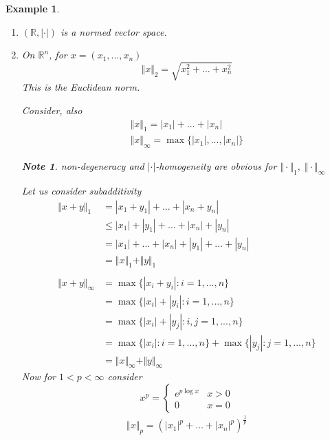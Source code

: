 \documentclass[11pt, oneside]{book}
\theoremstyle{break}
\newtheorem*{note}{Note}
\newtheorem{eg}{Example}[section]
\newcommand{\bb}[1]{\mathbb{#1}}			%
\begin{document}
\begin{eg}
	\begin{enumerate}
		\item $(\bb{R}, |\cdot|)$ is a normed vector space.
		\item On $\bb{R}^n$, for $x = (x_1, ..., x_n)$
			\begin{equation}
				\Vert x\Vert _2 = \sqrt{x_1^2 + \hdots + x_n^2}
			\end{equation}
			This is the Euclidean norm.

			Consider, also
			\begin{gather*}
				\Vert x\Vert _1 = |x_1| + \hdots + |x_n| \\
				\Vert x\Vert _\infty = \max\{|x_1|, ..., |x_n|\}
			\end{gather*}

			\begin{note}
				non-degeneracy and $|\cdot|$-homogeneity are obvious for $\Vert \cdot\Vert _1, \; \Vert \cdot\Vert _\infty$
			\end{note}

			Let us consider subadditivity
			\begin{align*}
				\Vert x + y\Vert _1 &= |x_1 + y_1| + \hdots + |x_n + y_n| \\
										&\leq |x_1| + |y_1| + \hdots + |x_n| + |y_n| \\
										&= |x_1| + \hdots + |x_n| + |y_1| + \hdots + |y_n| \\
										&= \Vert x\Vert _1 + \Vert y\Vert _1 \\
										\\
				\Vert x + y\Vert _\infty &= \max\{|x_i + y_i| : i = 1, ..., n\} \\
												&= \max\{|x_i| + |y_i| : i = 1, ..., n\} \\
												&= \max\{|x_i| + |y_j| : i, j = 1, ..., n\} \\
												&= \max\{|x_i| : i = 1, ..., n\} + \max\{|y_j| : j = 1, ..., n\}\\
												&= \Vert x\Vert _\infty + \Vert y\Vert _\infty
			\end{align*}
			Now for $1 < p < \infty$ consider
			\begin{equation}
				x^p =
					\begin{cases}
						e^{p \log x} & x > 0 \\
						0	& x = 0
					\end{cases}
			\end{equation}
			\begin{align*}
				\Vert x\Vert _p = (|x_1|^p + \hdots + |x_n|^p)^{\frac{1}{p}}
			\end{align*}

	\end{enumerate}
\end{eg}
\end{document}

